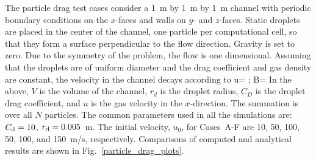 \documentclass[11pt]{book}
\begin{document}
The particle drag test cases consider a 1~m by 1~m by 1~m channel with periodic boundary conditions on the $x$-faces and  walls on $y$- and $z$-faces. Static droplets are placed in the center of the channel, one particle per computational cell, so that they form a surface perpendicular to the flow direction. Gravity is set to zero. Due to the symmetry of the problem, the flow is one dimensional. Assuming that the droplets are of uniform diameter  and the drag coefficient and gas density are constant, the velocity in the channel decays according to
\be u=  \quad ; \quad B= \ee
In the above, $V$ is the volume of the channel, $r_{d}$ is the droplet radius, $C_{D}$ is the droplet drag coefficient, and $u$ is the gas velocity in the $x$-direction. The summation is over all $N$ particles.
The common parameters used in all the simulations are: $C_{\rm d}=10$, $r_{\rm d}=0.005$~m. The initial velocity, $u_0$, for Cases~A-F are 10, 50, 100, 50, 100, and 150~m/s, respectively. Comparisons of computed and analytical results are shown in Fig.~\ref{particle_drag_plots}.
\end{document}
